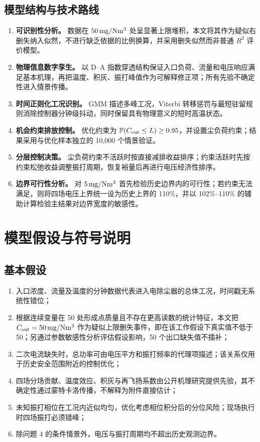 \subsection{模型结构与技术路线}


\begin{enumerate}
  \item \textbf{可识别性分析。} 数据在 $50\,\mathrm{mg/Nm^3}$ 处呈显著上限堆积，本文将其作为疑似右删失纳入似然，不进行缺乏依据的比例换算，并采用删失似然而非普通 $R^2$ 评价模型。
  \item \textbf{物理信息数字孪生。} 以 D--A 指数穿透结构保证入口负荷、流量和电压响应满足基本机理，再把温度、积灰、振打峰值作为可解释修正项；所有先验不确定性进入情景传播。
  \item \textbf{时间正则化工况识别。} GMM 描述多峰工况，Viterbi 转移惩罚与最短驻留规则消除控制器分钟级抖动，同时保留具有物理意义的短时高温状态。
  \item \textbf{机会约束排放控制。} 优化约束为 $\mathbb{P}(C_{\mathrm{out}}\le L)\ge0.95$，并设置尘负荷约束；结果采用与优化样本独立的 10,000 个情景验证。
  \item \textbf{分层控制决策。} 尘负荷约束不活跃时按直接减排收益排序；约束活跃时先按约束松弛收益调整振打周期，恢复裕量后再进行电压经济性排序。
  \item \textbf{边界可行性分析。} 对 $5\,\mathrm{mg/Nm^3}$ 首先检验历史边界内的可行性；若约束无法满足，则将四场电压上界统一设为历史上界的 110\%，并以 102\%--110\% 的辅助计算检验主结果对边界宽度的敏感性。
\end{enumerate}

\section{模型假设与符号说明}

\subsection{基本假设}

\begin{enumerate}
  \item 入口浓度、流量及温度的分钟数据代表进入电除尘器的总体工况，时间戳无系统性错位；
  \item 根据连续变量在 50 处形成点质量且不存在更高读数的统计特征，本文把 $C_{\mathrm{out}}=50\,\mathrm{mg/Nm^3}$ 作为疑似上限删失事件，即在该工作假设下真实值不低于 50；另通过参数敏感性分析评估假设影响，50 个出口缺失值不插补；
  \item 二次电流缺失时，总功率可由电压平方和振打频率的代理项描述；该关系仅用于历史安全范围附近的控制优化；
  \item 四场分场贡献、温度效应、积灰与再飞扬系数由公开机理研究提供先验，其不确定性通过蒙特卡洛传播，不解释为附件直接估计；
  \item 未知振打相位在工况内近似均匀，优化考虑相位积分后的分位风险；现场执行时四场振打必须错峰；
  \item 除问题 4 的条件情景外，电压与振打周期均不超出历史观测边界。
\end{enumerate}

